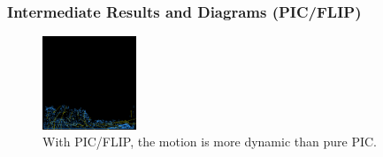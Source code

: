 \subsubsection{Intermediate Results and Diagrams (PIC/FLIP)}
\begin{figure}[h]
  \centering
  \includegraphics[width=0.25\textwidth]{figures/pic_flip_interm.png}
  \caption{With PIC/FLIP, the motion is more dynamic than pure PIC.}
  \label{fig:pic_flip}
\end{figure}

